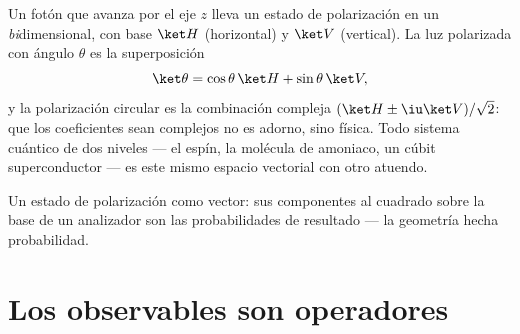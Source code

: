 \begin{example}\label{ex:b3:quantum-formalism:polarization}
Un fotón que avanza por el eje $z$ lleva un estado de polarización en un
 \emph{bi}dimensional, con base $\ket H$
(horizontal) y $\ket V$ (vertical). La luz polarizada con ángulo
$\theta$ es la superposición
\[
\ket\theta = \cos\theta\,\ket H + \sin\theta\,\ket V ,
\]
y la polarización circular es la combinación compleja $(\ket H \pm
\iu\ket V)/\sqrt2$: que los coeficientes sean complejos no es adorno,
sino física. Todo sistema cuántico de dos niveles --- el espín, la molécula
de amoniaco, un cúbit superconductor --- es este mismo espacio vectorial con
otro atuendo.
\end{example}

\begin{omfigure}

{\small Un estado de polarización como vector: sus componentes al cuadrado
sobre la base de un analizador son las probabilidades de resultado --- la
geometría hecha probabilidad.}
\end{omfigure}

\section{Los observables son operadores}

